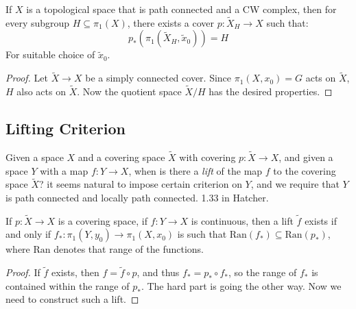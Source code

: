 \documentclass[crop=false,class=book,oneside]{standalone}
\begin{document}
        \begin{theorem}
            If $X$ is a topological space that is path connected
            and a CW complex, then for every subgroup
            $H\subseteq\pi_{1}(X)$, there exists a cover
            $p:\tilde{X}_{H}\rightarrow{X}$ such that:
            \begin{equation}
                p_{*}(\pi_{1}(\tilde{X}_{H},\tilde{x}_{0}))=H
            \end{equation}
            For suitable choice of $\tilde{x}_{0}$.
        \end{theorem}
        \begin{proof}
            Let $\tilde{X}\rightarrow{X}$ be a simply
            connected cover. Since $\pi_{1}(X,x_{0})=G$ acts on
            $\tilde{X}$, $H$ also acts on $\tilde{X}$. Now the
            quotient space $\tilde{X}/H$ has the desired
            properties.
        \end{proof}
        \subsection{Lifting Criterion}
            Given a space $X$ and a covering space
            $\tilde{X}$ with covering
            $p:\tilde{X}\rightarrow{X}$, and given a space
            $Y$ with a map $f:Y\rightarrow{X}$, when is there a
            \textit{lift} of the map $f$ to the covering
            space $\tilde{X}$? it seems natural to impose certain
            criterion on $Y$, and we require that $Y$ is
            path connected and locally path connected.
            1.33 in Hatcher.
            \begin{theorem}
                If $p:\tilde{X}\rightarrow{X}$ is a covering space,
                if $f:Y\rightarrow{X}$ is continuous, then a
                lift $\tilde{f}$ exists if and only if
                $f_{*}:\pi_{1}(Y,y_{0})\rightarrow\pi_{1}(X,x_{0})$
                is such that
                $\textrm{Ran}(f_{*})\subseteq\textrm{Ran}(p_{*})$,
                where $\textrm{Ran}$ denotes that range of the
                functions.
            \end{theorem}
            \begin{proof}
                If $\tilde{f}$ exists, then
                $f=\tilde{f}\circ{p}$, and thus
                $f_{*}=p_{*}\circ{f}_{*}$, so the range of
                $f_{*}$ is contained within the range of
                $p_{*}$. The hard part is going the other way.
                Now we need to construct such a lift.
            \end{proof}
\end{document}
